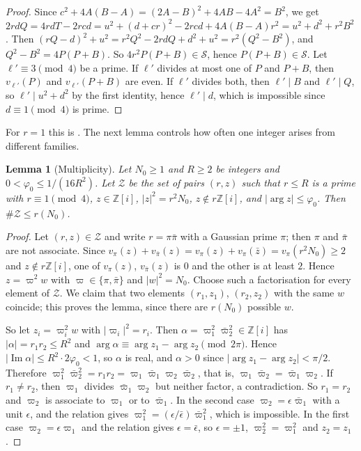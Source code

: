 \documentclass[11pt]{amsart}
\newtheorem{lemma}[theorem]{Lemma}
\theoremstyle{remark}
\theoremstyle{definition}
\numberwithin{equation}{section}
\newcommand{\Sc}{\mathcal{S}}
\newcommand{\Z}{\mathbb{Z}}
\newcommand{\Zc}{\mathcal{Z}}
\newcommand{\Zi}{\Z[i]}
\begin{document}
\begin{proof}
Since $c^2+4A(B-A)=(2A-B)^2+4AB-4A^2=B^2$, we get $2rdQ=4rdT-2rcd=u^2+(d+cr)^2-2rcd+4A(B-A)r^2=u^2+d^2+r^2B^2$. Then $(rQ-d)^2+u^2=r^2Q^2-2rdQ+d^2+u^2=r^2(Q^2-B^2)$, and $Q^2-B^2=4P(P+B)$. So $4r^2P(P+B)\in\Sc$, hence $P(P+B)\in\Sc$. Let $\ell'\equiv3\pmod4$ be a prime. If $\ell'$ divides at most one of $P$ and $P+B$, then $v_{\ell'}(P)$ and $v_{\ell'}(P+B)$ are even. If $\ell'$ divides both, then $\ell'\mid B$ and $\ell'\mid Q$, so $\ell'\mid u^2+d^2$ by the first identity, hence $\ell'\mid d$, which is impossible since $d\equiv1\pmod4$ is prime.
\end{proof}

For $r=1$ this is \cite[Lemmas~2.4 and~2.5]{IC}. The next lemma controls how often one integer arises from different families.

\begin{lemma}[Multiplicity]\label{lem:mult}
Let $N_0\ge1$ and $R\ge2$ be integers and $0<\varphi_0\le1/(16R^2)$. Let $\Zc$ be the set of pairs $(r,z)$ such that $r\le R$ is a prime with $r\equiv1\pmod4$, $z\in\Zi$, $|z|^2=r^2N_0$, $z\notin r\Zi$, and $|\arg z|\le\varphi_0$. Then $\#\Zc\le r(N_0)$.
\end{lemma}

\begin{proof}
Let $(r,z)\in\Zc$ and write $r=\pi\bar\pi$ with a Gaussian prime $\pi$; then $\pi$ and $\bar\pi$ are not associate. Since $v_\pi(z)+v_{\bar\pi}(z)=v_\pi(z)+v_\pi(\bar z)=v_\pi(r^2N_0)\ge2$ and $z\notin r\Zi$, one of $v_\pi(z)$, $v_{\bar\pi}(z)$ is $0$ and the other is at least $2$. Hence $z=\varpi^2w$ with $\varpi\in\{\pi,\bar\pi\}$ and $|w|^2=N_0$. Choose such a factorisation for every element of $\Zc$. We claim that two elements $(r_1,z_1)$, $(r_2,z_2)$ with the same $w$ coincide; this proves the lemma, since there are $r(N_0)$ possible $w$.

So let $z_i=\varpi_i^2w$ with $|\varpi_i|^2=r_i$. Then $\alpha=\varpi_1^2\bar\varpi_2^2\in\Zi$ has $|\alpha|=r_1r_2\le R^2$ and $\arg\alpha\equiv\arg z_1-\arg z_2\pmod{2\pi}$. Hence $|\operatorname{Im}\alpha|\le R^2\cdot2\varphi_0<1$, so $\alpha$ is real, and $\alpha>0$ since $|\arg z_1-\arg z_2|<\pi/2$. Therefore $\varpi_1^2\bar\varpi_2^2=r_1r_2=\varpi_1\bar\varpi_1\varpi_2\bar\varpi_2$, that is, $\varpi_1\bar\varpi_2=\bar\varpi_1\varpi_2$. If $r_1\ne r_2$, then $\varpi_1$ divides $\bar\varpi_1\varpi_2$ but neither factor, a contradiction. So $r_1=r_2$ and $\varpi_2$ is associate to $\varpi_1$ or to $\bar\varpi_1$. In the second case $\varpi_2=\epsilon\bar\varpi_1$ with a unit $\epsilon$, and the relation gives $\varpi_1^2=(\epsilon/\bar\epsilon)\bar\varpi_1^2$, which is impossible. In the first case $\varpi_2=\epsilon\varpi_1$ and the relation gives $\epsilon=\bar\epsilon$, so $\epsilon=\pm1$, $\varpi_2^2=\varpi_1^2$ and $z_2=z_1$.
\end{proof}
\end{document}
